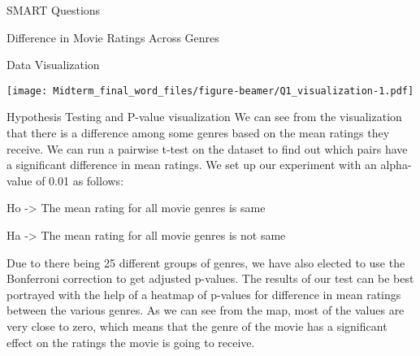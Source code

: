 \documentclass[
  ignorenonframetext,
]{beamer}
\newenvironment{Shaded}{\begin{snugshade}}{\end{snugshade}}
\newcommand{\AttributeTok}[1]{\textcolor[rgb]{0.77,0.63,0.00}{#1}}
\newcommand{\DecValTok}[1]{\textcolor[rgb]{0.00,0.00,0.81}{#1}}
\newcommand{\FloatTok}[1]{\textcolor[rgb]{0.00,0.00,0.81}{#1}}
\newcommand{\FunctionTok}[1]{\textcolor[rgb]{0.00,0.00,0.00}{#1}}
\newcommand{\NormalTok}[1]{#1}
\newcommand{\OtherTok}[1]{\textcolor[rgb]{0.56,0.35,0.01}{#1}}
\newcommand{\SpecialCharTok}[1]{\textcolor[rgb]{0.00,0.00,0.00}{#1}}
\newcommand{\StringTok}[1]{\textcolor[rgb]{0.31,0.60,0.02}{#1}}
\begin{document}
\begin{frame}[fragile]{SMART Questions}
\begin{block}{Difference in Movie Ratings Across Genres}
\begin{block}{Data Visualization}
\begin{Shaded}
\end{Shaded}

\texttt{[image: Midterm\_final\_word\_files/figure-beamer/Q1\_visualization-1.pdf]}
\end{block}

\begin{block}{Hypothesis Testing and P-value visualization}
\protect\hypertarget{hypothesis-testing-and-p-value-visualization}{}
We can see from the visualization that there is a difference among some
genres based on the mean ratings they receive. We can run a pairwise
t-test on the dataset to find out which pairs have a significant
difference in mean ratings. We set up our experiment with an alpha-value
of 0.01 as follows:

Ho -\textgreater{} The mean rating for all movie genres is same

Ha -\textgreater{} The mean rating for all movie genres is not same

Due to there being 25 different groups of genres, we have also elected
to use the Bonferroni correction to get adjusted p-values. The results
of our test can be best portrayed with the help of a heatmap of p-values
for difference in mean ratings between the various genres. As we can see
from the map, most of the values are very close to zero, which means
that the genre of the movie has a significant effect on the ratings the
movie is going to receive.


\end{block}
\end{block}
\end{frame}
\end{document}

